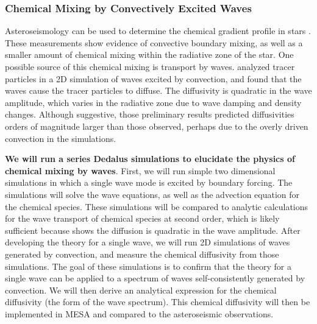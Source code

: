\subsubsection{Chemical Mixing by Convectively Excited Waves}

Asteroseismology can be used to determine the chemical gradient profile in stars \citep{moravveji:15,moravveji:16,Ghasemi_2016}. These measurements show evidence of convective boundary mixing, as well as a smaller amount of chemical mixing within the radiative zone of the star. One possible source of this chemical mixing is transport by waves. \citet{Rogers2017} analyzed tracer particles in a 2D simulation of waves excited by convection, and found that the waves cause the tracer particles to diffuse. The diffusivity is quadratic in the wave amplitude, which varies in the radiative zone due to wave damping and density changes. Although suggestive, those preliminary results predicted diffusivities orders of magnitude larger than those observed, perhaps due to the overly driven convection in the simulations. 

\textbf{We will run a series Dedalus simulations to elucidate the physics of chemical mixing by waves}. First, we will run simple two dimensional simulations in which a single wave mode is excited by boundary forcing. The simulations will solve the wave equations, as well as the advection equation for the chemical species. These simulations will be compared to analytic calculations for the wave transport of chemical species at second order, which is likely sufficient because \citet{Rogers2017} shows the diffusion is quadratic in the wave amplitude. After developing the theory for a single wave, we will run 2D simulations of waves generated by convection, and measure the chemical diffusivity from those simulations. The goal of these simulations is to confirm that the theory for a single wave can be applied to a spectrum of waves self-consistently generated by convection. We will then derive an analytical expression for the chemical diffusivity (the form of the wave spectrum). This chemical diffusivity will then be implemented in MESA and compared to the asteroseismic observations.
